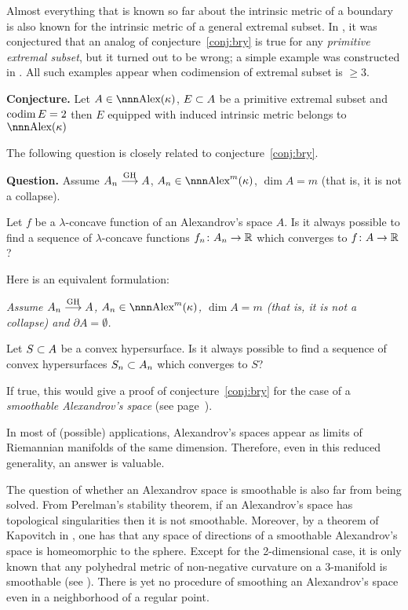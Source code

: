 \documentclass{article}
\begin{document}
Almost everything that is known so far about the intrinsic metric of a boundary is also known for the intrinsic metric of a general extremal subset.
In \cite{perelman-petrunin:extremal}, it was conjectured  that an analog of conjecture~\ref{conj:bry} is true for any \emph{primitive extremal subset}, but it turned out to be wrong; a simple example was constructed in \cite{petrunin:extremal}. 
All such examples appear when codimension of extremal subset is $\ge 3$.

\begin{thm}{\bf Conjecture.}\label{conj:codim=2}
Let $A\in\Alex(\kappa)$, $E\subset A$ be a primitive extremal subset and $\operatorname{codim}
E=2$ then $E$ equipped with induced intrinsic metric belongs to  $\Alex(\kappa)$
\end{thm}

The following question is closely related to conjecture~\ref{conj:bry}.

\begin{thm}{\bf Question.}\label{qst:lift-conc}
Assume $A_n\GHto A$, $A_n\in \Alex^m(\kappa)$, $\dim A=m$ (that is, 
it is not a collapse).

Let $f$ be a $\lambda$-concave function of an Alexandrov's space $A$. 
Is it always possible to find a sequence of $\lambda$-concave functions
$f_n\colon A_n\to \mathbb{R}$ which converges to $f\colon A\to\mathbb{R}$? 
\end{thm}

Here is an equivalent formulation:

\bigskip

 {\it Assume $A_n\GHto A$, $A_n\in \Alex^m(\kappa)$, $\dim
A=m$ (that is, it is not a collapse) and $\partial A=\emptyset$.

Let $S\subset A$ be a convex hypersurface. 
Is it always possible to find a sequence of convex hypersurfaces $S_n\subset A_n$
which converges to $S$?
}

\bigskip

If true, this would give a proof of  conjecture~\ref{conj:bry} for the
case of a \emph{smoothable Alexandrov's space} (see page~\pageref{smoothable}).

In most of (possible) applications, Alexandrov's spaces appear as
limits of Riemannian manifolds of the same dimension.
Therefore, even in this reduced generality, 
an answer is valuable.

The question of whether an Alexandrov space is smoothable is also far from being solved.
From Perelman's stability theorem, if an Alexandrov's space has topological singularities then it is not smoothable.
Moreover, by a theorem of Kapovitch in \cite{kapovitch:regularity},
one has that any space of
directions of a smoothable Alexandrov's space is homeomorphic to the sphere. 
Except for the 2-dimensional case, it is only known that any polyhedral metric of non-negative curvature on a 3-manifold is smoothable (see \cite{matveev:smooth}).
There is yet no procedure of smoothing an Alexandrov's space even in a neighborhood of a regular point.
\end{document}
